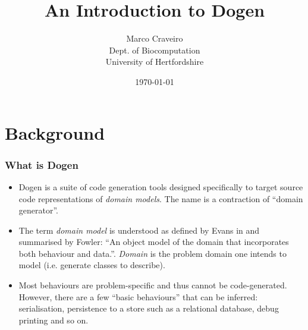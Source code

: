 \documentclass{beamer}
\title{An Introduction to Dogen}
\author{Marco Craveiro \\
    Dept. of Biocomputation \\
    University of Hertfordshire
}
\date{\today}
\begin{document}

\section{Background}

\begin{frame}
\frametitle{What is Dogen}

\begin{itemize}

\item Dogen is a suite of code generation tools designed specifically
  to target source code representations of \emph{domain models}. The
  name is a contraction of ``domain generator''.

\pause

\item The term \emph{domain model} is understood as defined by Evans
  in \cite{Evans04} and summarised by Fowler: ``An object model of the
  domain that incorporates both behaviour and
  data.''\cite{Fowler2015}. \emph{Domain} is the problem domain one
  intends to model (i.e. generate classes to describe).

\pause

\item Most behaviours are problem-specific and thus cannot be
  code-generated. However, there are a few ``basic behaviours'' that
  can be inferred: serialisation, persistence to a store such as a
  relational database, debug printing and so on.

\end{itemize}

\end{frame}
\end{document}
